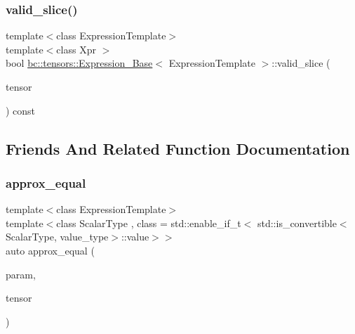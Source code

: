 \subsubsection{\texorpdfstring{valid\+\_\+slice()}{valid\_slice()}}
{\footnotesize\ttfamily template$<$class Expression\+Template$>$ \\
template$<$class Xpr $>$ \\
bool \hyperlink{classbc_1_1tensors_1_1Expression__Base}{bc\+::tensors\+::\+Expression\+\_\+\+Base}$<$ Expression\+Template $>$\+::valid\+\_\+slice (\begin{DoxyParamCaption}\item[{const \hyperlink{classbc_1_1tensors_1_1Expression__Base}{Expression\+\_\+\+Base}$<$ Xpr $>$ \&}]{tensor }\end{DoxyParamCaption}) const\hspace{0.3cm}{\ttfamily [inline]}}



\subsection{Friends And Related Function Documentation}
\mbox{\label{classbc_1_1tensors_1_1Expression__Base_ac085082a371f111c69a4354961232029}} 
\subsubsection{\texorpdfstring{approx\+\_\+equal}{approx\_equal}}
{\footnotesize\ttfamily template$<$class Expression\+Template$>$ \\
template$<$class Scalar\+Type , class  = std\+::enable\+\_\+if\+\_\+t$<$   std\+::is\+\_\+convertible$<$\+Scalar\+Type, value\+\_\+type$>$\+::value$>$$>$ \\
auto approx\+\_\+equal (\begin{DoxyParamCaption}\item[{const Scalar\+Type \&}]{param,  }\item[{const \hyperlink{classbc_1_1tensors_1_1Expression__Base}{Expression\+\_\+\+Base}$<$ Expression\+Template $>$ \&}]{tensor }\end{DoxyParamCaption})\hspace{0.3cm}{\ttfamily [friend]}}

